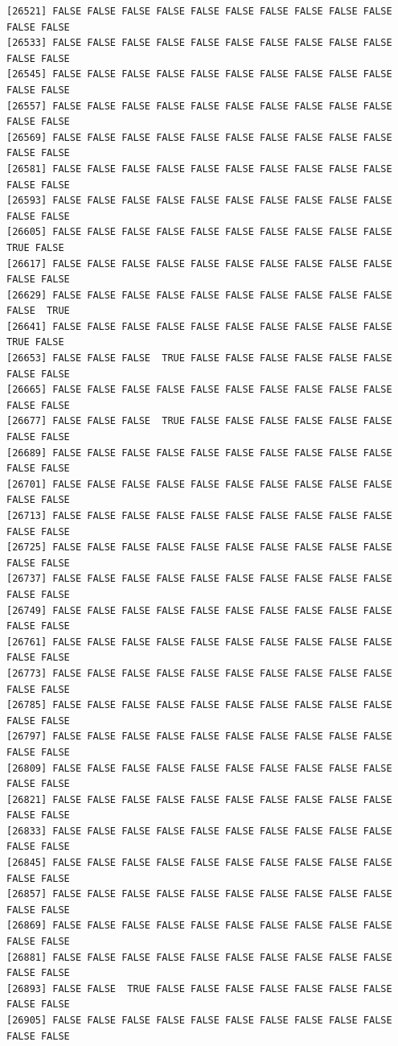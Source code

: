 \documentclass[
  a4paper,
  DIV=11,
  numbers=noendperiod]{scrartcl}
\begin{document}
\begin{verbatim}
[26521] FALSE FALSE FALSE FALSE FALSE FALSE FALSE FALSE FALSE FALSE FALSE FALSE
[26533] FALSE FALSE FALSE FALSE FALSE FALSE FALSE FALSE FALSE FALSE FALSE FALSE
[26545] FALSE FALSE FALSE FALSE FALSE FALSE FALSE FALSE FALSE FALSE FALSE FALSE
[26557] FALSE FALSE FALSE FALSE FALSE FALSE FALSE FALSE FALSE FALSE FALSE FALSE
[26569] FALSE FALSE FALSE FALSE FALSE FALSE FALSE FALSE FALSE FALSE FALSE FALSE
[26581] FALSE FALSE FALSE FALSE FALSE FALSE FALSE FALSE FALSE FALSE FALSE FALSE
[26593] FALSE FALSE FALSE FALSE FALSE FALSE FALSE FALSE FALSE FALSE FALSE FALSE
[26605] FALSE FALSE FALSE FALSE FALSE FALSE FALSE FALSE FALSE FALSE  TRUE FALSE
[26617] FALSE FALSE FALSE FALSE FALSE FALSE FALSE FALSE FALSE FALSE FALSE FALSE
[26629] FALSE FALSE FALSE FALSE FALSE FALSE FALSE FALSE FALSE FALSE FALSE  TRUE
[26641] FALSE FALSE FALSE FALSE FALSE FALSE FALSE FALSE FALSE FALSE  TRUE FALSE
[26653] FALSE FALSE FALSE  TRUE FALSE FALSE FALSE FALSE FALSE FALSE FALSE FALSE
[26665] FALSE FALSE FALSE FALSE FALSE FALSE FALSE FALSE FALSE FALSE FALSE FALSE
[26677] FALSE FALSE FALSE  TRUE FALSE FALSE FALSE FALSE FALSE FALSE FALSE FALSE
[26689] FALSE FALSE FALSE FALSE FALSE FALSE FALSE FALSE FALSE FALSE FALSE FALSE
[26701] FALSE FALSE FALSE FALSE FALSE FALSE FALSE FALSE FALSE FALSE FALSE FALSE
[26713] FALSE FALSE FALSE FALSE FALSE FALSE FALSE FALSE FALSE FALSE FALSE FALSE
[26725] FALSE FALSE FALSE FALSE FALSE FALSE FALSE FALSE FALSE FALSE FALSE FALSE
[26737] FALSE FALSE FALSE FALSE FALSE FALSE FALSE FALSE FALSE FALSE FALSE FALSE
[26749] FALSE FALSE FALSE FALSE FALSE FALSE FALSE FALSE FALSE FALSE FALSE FALSE
[26761] FALSE FALSE FALSE FALSE FALSE FALSE FALSE FALSE FALSE FALSE FALSE FALSE
[26773] FALSE FALSE FALSE FALSE FALSE FALSE FALSE FALSE FALSE FALSE FALSE FALSE
[26785] FALSE FALSE FALSE FALSE FALSE FALSE FALSE FALSE FALSE FALSE FALSE FALSE
[26797] FALSE FALSE FALSE FALSE FALSE FALSE FALSE FALSE FALSE FALSE FALSE FALSE
[26809] FALSE FALSE FALSE FALSE FALSE FALSE FALSE FALSE FALSE FALSE FALSE FALSE
[26821] FALSE FALSE FALSE FALSE FALSE FALSE FALSE FALSE FALSE FALSE FALSE FALSE
[26833] FALSE FALSE FALSE FALSE FALSE FALSE FALSE FALSE FALSE FALSE FALSE FALSE
[26845] FALSE FALSE FALSE FALSE FALSE FALSE FALSE FALSE FALSE FALSE FALSE FALSE
[26857] FALSE FALSE FALSE FALSE FALSE FALSE FALSE FALSE FALSE FALSE FALSE FALSE
[26869] FALSE FALSE FALSE FALSE FALSE FALSE FALSE FALSE FALSE FALSE FALSE FALSE
[26881] FALSE FALSE FALSE FALSE FALSE FALSE FALSE FALSE FALSE FALSE FALSE FALSE
[26893] FALSE FALSE  TRUE FALSE FALSE FALSE FALSE FALSE FALSE FALSE FALSE FALSE
[26905] FALSE FALSE FALSE FALSE FALSE FALSE FALSE FALSE FALSE FALSE FALSE FALSE

\end{verbatim}
\end{document}
